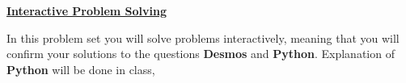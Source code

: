 \documentclass[12pt]{article} %
\begin{document}
	\renewcommand*{\coursecode}{MATH 235} %
	\renewcommand*{\assgnnumber}{Assignment 1} %
	\renewcommand*{\submdate}{September 14, 2021} %
	\renewcommand*{\studentfname}{Abdullah} %
	\renewcommand*{\studentlname}{Zubair} %
    \renewcommand*{\proofname}{Proof:}

	\renewcommand\qedsymbol{$\blacksquare$}
	\setfigpath
	\fancyhfoffset[L,O]{0pt} %




\begin{center}
	\textbf{\underline{\Huge{Interactive Problem Solving}}}
\end{center}

In this problem set you will solve problems interactively, meaning that you will confirm your solutions to the questions
\textbf{Desmos} and \textbf{Python}. Explanation of \textbf{Python} will be done in class,
\end{document}

